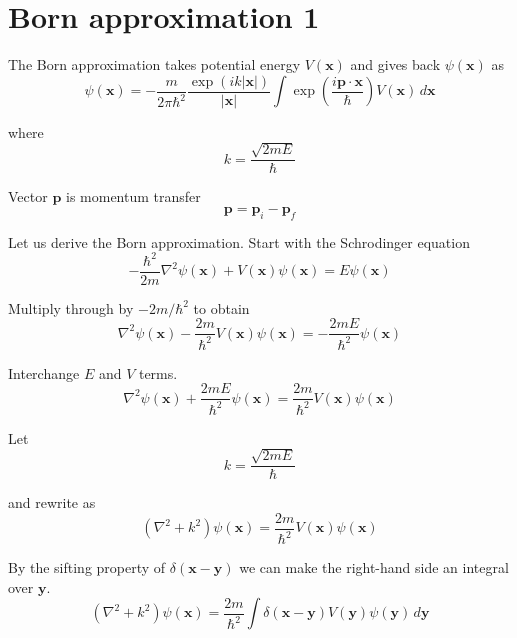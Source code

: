 

\section*{Born approximation 1}

The Born approximation takes potential energy $V(\mathbf x)$
and gives back $\psi(\mathbf x)$ as
\begin{equation*}
\psi(\mathbf x)=-\frac{m}{2\pi\hbar^2}\frac{\exp(ik|\mathbf x|)}{|\mathbf x|}
\int\exp\left(\frac{i\mathbf p\cdot\mathbf x}{\hbar}\right)V(\mathbf x)\,d\mathbf x
\end{equation*}

where
\begin{equation*}
k=\frac{\sqrt{2mE}}{\hbar}
\end{equation*}

Vector $\mathbf p$ is momentum transfer
\begin{equation*}
\mathbf p=\mathbf p_i-\mathbf p_f
\end{equation*}

Let us derive the Born approximation.
Start with the Schrodinger equation
\begin{equation*}
-\frac{\hbar^2}{2m}\nabla^2\psi(\mathbf x)+V(\mathbf x)\psi(\mathbf x)=E\psi(\mathbf x)
\end{equation*}

Multiply through by $-2m/\hbar^2$ to obtain
\begin{equation*}
\nabla^2\psi(\mathbf x)-\frac{2m}{\hbar^2}V(\mathbf x)\psi(\mathbf x)=-\frac{2mE}{\hbar^2}\psi(\mathbf x)
\end{equation*}

Interchange $E$ and $V$ terms.
\begin{equation*}
\nabla^2\psi(\mathbf x)+\frac{2mE}{\hbar^2}\psi(\mathbf x)
=\frac{2m}{\hbar^2}V(\mathbf x)\psi(\mathbf x)
\end{equation*}

Let
\begin{equation*}
k=\frac{\sqrt{2mE}}{\hbar}
\end{equation*}

and rewrite as
\begin{equation*}
\left(\nabla^2+k^2\right)\psi(\mathbf x)=\frac{2m}{\hbar^2}V(\mathbf x)\psi(\mathbf x)
\end{equation*}

By the sifting property of $\delta(\mathbf x-\mathbf y)$ we can make the right-hand
side an integral over $\mathbf y$.
\begin{equation*}
\left(\nabla^2+k^2\right)\psi(\mathbf x)=\frac{2m}{\hbar^2}
\int\delta(\mathbf x-\mathbf y)V(\mathbf y)\psi(\mathbf y)\,d\mathbf y
\end{equation*}

